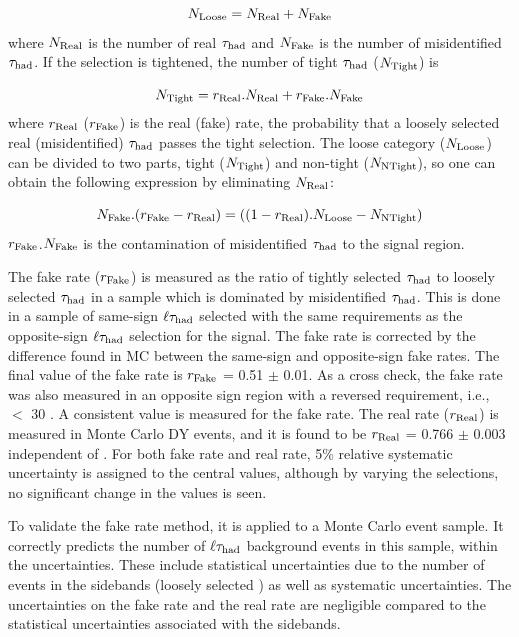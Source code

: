 \begin{equation}
N_{\rm Loose} = N_{\rm Real} + N_{\rm Fake}
\end{equation}
where $N_{\rm Real}$ is the number of real $\tau_{\rm had}$ and $N_{\rm Fake}$ is the number of misidentified 
$\tau_{\rm had}$. If the selection is tightened, the number of tight $\tau_{\rm had}$ ($N_{\rm Tight}$) is

\begin{equation}
 N_{\rm Tight} = r_{\rm Real}.N_{\rm Real} + r_{\rm Fake}.N_{\rm Fake}
\end{equation} 
where $r_{\rm Real}$ ($r_{\rm Fake}$) is the real (fake) rate, the probability that a loosely selected real (misidentified) $\tau_{\rm had}$ passes the  tight  selection. 
The loose category ($N_{\rm Loose}$) can be divided to two parts, 
tight ($N_{\rm Tight}$) and non-tight ($N_{\rm NTight}$), so one can obtain the following expression by eliminating $N_{\rm Real}$:

\begin{equation}
   N_{\rm Fake}.(r_{\rm Fake}-r_{\rm Real}) = ((1 - r_{\rm Real}).N_{\rm Loose}  - N_{\rm NTight})
\end{equation}
$r_{\rm Fake}$.$N_{\rm Fake}$ is the contamination of misidentified $\tau_{\rm had}$ to the signal region. 

The fake rate ($r_{\rm Fake}$) is measured as the ratio of tightly selected $\tau_{\rm had}$ to loosely 
selected $\tau_{\rm had}$ in a sample which is dominated by misidentified $\tau_{\rm had}$. This is done in a sample of same-sign $\ell\tau_{\rm had}$ selected 
with the same requirements as the opposite-sign $\ell\tau_{\rm had}$
selection for the signal.
The fake rate is corrected by the difference found in MC between the 
same-sign and opposite-sign fake rates.
The final value of the fake rate is $r_{\rm Fake}$ = 0.51 $\pm$ 0.01. 
As a cross check, the fake rate was also measured in an opposite sign region with a reversed
\MPT requirement, i.e., \MPT $<$ 30 \GeV.
A consistent value is measured for the fake rate.  
The real rate ($r_{\rm Real}$) is measured in Monte Carlo DY events, and it is found to 
be $r_{\rm Real}$ = 0.766 $\pm$ 0.003 independent of \mttwo. 
For both fake rate and real rate, 5\% relative systematic uncertainty is assigned to the central values, although 
by varying the selections, no significant change in the values is seen.

To validate the fake rate method, it is applied to a \wjets Monte Carlo event sample. 
It correctly
predicts the number of $\ell\tau_{\rm had}$ background events in this sample, within the 
uncertainties.
These include statistical uncertainties due to the number of events in the 
sidebands (loosely selected \Tau) as well as 
systematic uncertainties.
The uncertainties on the %
fake rate and the real rate %
are negligible compared to the statistical uncertainties associated with 
the sidebands. 

